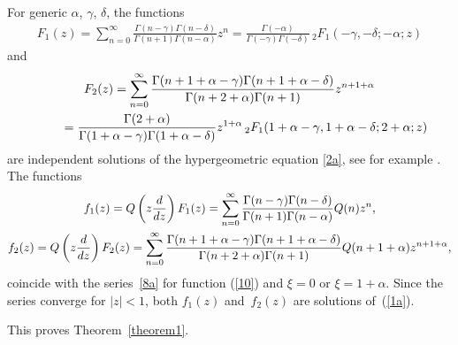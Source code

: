 \documentclass[11pt]{article}
\numberwithin{equation}{section}
\begin{document}
For generic $\alpha$, $\gamma$, $\delta$, the functions
\begin{gather*}
F_1(z) = \sum_{n=0}^\infty \frac{\Gamma(n-\gamma) \Gamma(n-\delta)}{\Gamma(n+1) \Gamma(n-\alpha)} z^n = \frac{\Gamma(-\alpha)}{\Gamma(-\gamma) \Gamma(-\delta)} \,{}_2F_1(-\gamma,-\delta;-\alpha;z)
\end{gather*}
and
\begin{gather*}
F_2(z)= \sum_{n=0}^\infty
\frac{\Gamma(n+1+\alpha-\gamma) \Gamma(n+1+\alpha-\delta)} {\Gamma(n+2+\alpha) \Gamma(n+1)} z^{n+1+\alpha}\\
\hphantom{F_2(z)}{} = \frac{\Gamma(2+\alpha)} {\Gamma(1+\alpha-\gamma) \Gamma(1+\alpha-\delta)} z^{1+\alpha} \, {}_2F_1(1+\alpha-\gamma,1+\alpha-\delta;2+\alpha;z)
\end{gather*}
are independent solutions of the hypergeometric equation \eqref{2a}, see for example \cite{Mellin}. The functions
\begin{gather*}
f_1(z) = Q\left({z\frac{{\rm d}}{{\rm d}z}}\right) F_1(z) = \sum_{n=0}^\infty \frac{\Gamma(n-\gamma) \Gamma(n-\delta)}{\Gamma(n+1) \Gamma(n-\alpha)} Q(n) z^n,\\
f_2(z) = Q\left({z\frac{{\rm d}}{{\rm d}z}}\right) F_2(z) = \sum_{n=0}^\infty\frac{\Gamma(n+1+\alpha-\gamma) \Gamma(n+1+\alpha-\delta)}{\Gamma(n+2+\alpha) \Gamma(n+1)} Q(n+1+\alpha) z^{n+1+\alpha},
\end{gather*}
coincide with the series~\eqref{8a} for function (\ref{10}) and $\xi=0$ or $\xi=1+\alpha$. Since the series converge for $|z|<1$, both $f_1(z)$ and~$f_2(z)$ are solutions of~(\ref{1a}).

This proves Theorem~\ref{theorem1}.
\end{document}
